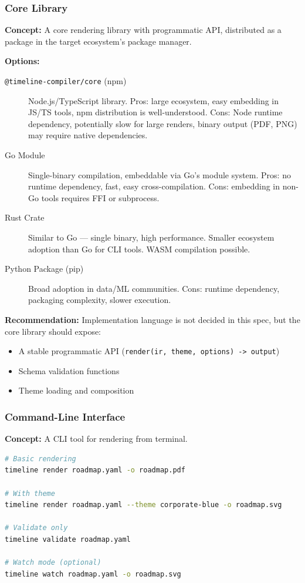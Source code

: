 \subsubsection{Core Library}

\textbf{Concept:} A core rendering library with programmatic API, distributed as a package in the target ecosystem's package manager.

\textbf{Options:}
\begin{description}
  \item[\texttt{@timeline-compiler/core} (npm)] Node.js/TypeScript library. Pros: large ecosystem, easy embedding in JS/TS tools, npm distribution is well-understood. Cons: Node runtime dependency, potentially slow for large renders, binary output (PDF, PNG) may require native dependencies.
  
  \item[Go Module] Single-binary compilation, embeddable via Go's module system. Pros: no runtime dependency, fast, easy cross-compilation. Cons: embedding in non-Go tools requires FFI or subprocess.
  
  \item[Rust Crate] Similar to Go — single binary, high performance. Smaller ecosystem adoption than Go for CLI tools. WASM compilation possible.
  
  \item[Python Package (pip)] Broad adoption in data/ML communities. Cons: runtime dependency, packaging complexity, slower execution.
\end{description}

\textbf{Recommendation:} Implementation language is not decided in this spec, but the core library should expose:
\begin{itemize}
  \item A stable programmatic API (\texttt{render(ir, theme, options) -> output})
  \item Schema validation functions
  \item Theme loading and composition
\end{itemize}

\subsubsection{Command-Line Interface}

\textbf{Concept:} A CLI tool for rendering from terminal.

\begin{lstlisting}[language=bash,caption={CLI usage examples}]
# Basic rendering
timeline render roadmap.yaml -o roadmap.pdf

# With theme
timeline render roadmap.yaml --theme corporate-blue -o roadmap.svg

# Validate only
timeline validate roadmap.yaml

# Watch mode (optional)
timeline watch roadmap.yaml -o roadmap.svg
\end{lstlisting}

